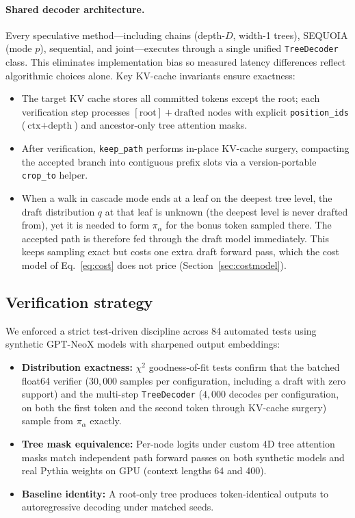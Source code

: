 \documentclass[10pt]{article}
\begin{document}
\paragraph{Shared decoder architecture.} Every speculative method—including chains (depth-$D$, width-1 trees), SEQUOIA (mode $p$), sequential, and joint—executes through a single unified \texttt{TreeDecoder} class. This eliminates implementation bias so measured latency differences reflect algorithmic choices alone. Key KV-cache invariants ensure exactness:
\begin{itemize}
    \item The target KV cache stores all committed tokens except the root; each verification step processes $[\text{root}] + \text{drafted nodes}$ with explicit \texttt{position\_ids} ($\text{ctx} + \text{depth}$) and ancestor-only tree attention masks.
    \item After verification, \texttt{keep\_path} performs in-place KV-cache surgery, compacting the accepted branch into contiguous prefix slots via a version-portable \texttt{crop\_to} helper.
    \item When a walk in cascade mode ends at a leaf on the deepest tree level, the draft distribution $q$ at that leaf is unknown (the deepest level is never drafted from), yet it is needed to form $\pi_\alpha$ for the bonus token sampled there. The accepted path is therefore fed through the draft model immediately. This keeps sampling exact but costs one extra draft forward pass, which the cost model of Eq.~\eqref{eq:cost} does not price (Section~\ref{sec:costmodel}).
\end{itemize}

\subsection{Verification strategy}
We enforced a strict test-driven discipline across 84 automated tests using synthetic GPT-NeoX models with sharpened output embeddings:
\begin{itemize}
    \item \textbf{Distribution exactness:} $\chi^2$ goodness-of-fit tests confirm that the batched float64 verifier ($30{,}000$ samples per configuration, including a draft with zero support) and the multi-step \texttt{TreeDecoder} ($4{,}000$ decodes per configuration, on both the first token and the second token through KV-cache surgery) sample from $\pi_\alpha$ exactly.
    \item \textbf{Tree mask equivalence:} Per-node logits under custom 4D tree attention masks match independent path forward passes on both synthetic models and real Pythia weights on GPU (context lengths 64 and 400).
    \item \textbf{Baseline identity:} A root-only tree produces token-identical outputs to autoregressive decoding under matched seeds.
\end{itemize}
\end{document}
